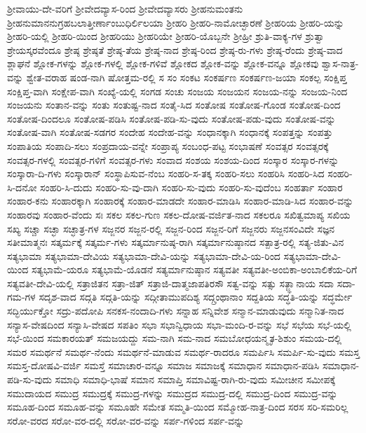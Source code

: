 {ಶ್ರೀವಾಯು-ದೇ-ವರಿಗೆ
ಶ್ರೀವೇದವ್ಯಾಸ-ರಿಂದ
ಶ್ರೀವೇದವ್ಯಾಸರು
ಶ್ರೀಹನುಮಂತನು
ಶ್ರೀಹನುಮಾನನುಗ್ರಹಬಲಾತ್ತೀರ್ಣಾಂಬುಧಿರ್ಲಿಲಯಾ
ಶ್ರೀಹರಿ
ಶ್ರೀಹರಿ-ನಾಮೋಚ್ಛಾರಣೆ
ಶ್ರೀಹರಿಯ
ಶ್ರೀಹರಿ-ಯನ್ನು
ಶ್ರೀಹರಿ-ಯಲ್ಲಿ
ಶ್ರೀಹರಿ-ಯಿಂದ
ಶ್ರೀಹರಿಯು
ಶ್ರೀಹರಿಯೇ
ಶ್ರೀಹರಿ-ಯೊಬ್ಬನೇ
ಶ್ರೀಹ್ರೀ
ಶ್ರುತಿ-ವಾಕ್ಯ-ಗಳ
ಶ್ರುತ್ವಾ
ಶ್ರೇಯಸ್ಕರವೆಂದೂ
ಶ್ರೇಷ್ಠ
ಶ್ರೇಷ್ಠತೆ
ಶ್ರೇಷ್ಠ-ತೆಯ
ಶ್ರೇಷ್ಠ-ನಾದ
ಶ್ರೇಷ್ಠ-ರಿಂದ
ಶ್ರೇಷ್ಠ-ರು-ಗಳು
ಶ್ರೇಷ್ಠ-ರೆಂದು
ಶ್ರೇಷ್ಠ-ವಾದ
ಶ್ಲಾಘನೆ
ಶ್ಲೋಕ-ಗಳನ್ನು
ಶ್ಲೋಕ-ಗಳಲ್ಲಿ
ಶ್ಲೋಕ-ಗಳಿವೆ
ಶ್ಲೋಕದ
ಶ್ಲೋಕ-ವನ್ನು
ಶ್ಲೋಕ-ವನ್ನೂ
ಶ್ಲೋಕವು
ಶ್ವಾಸ-ನಾತ್ರ-ವನ್ನು
ಶ್ವೇತ-ವರಾಹ
ಷಂಡ-ನಾಗಿ
ಷೋತ್ತಮ-ರಲ್ಲಿ
ಸ
ಸಂ
ಸಂಕಟ
ಸಂಕರ್ಷಣ
ಸಂಕರ್ಷಣ-ಜಯಾ
ಸಂಕಲ್ಪ
ಸಂಕ್ಷಿಪ್ತ
ಸಂಕ್ಷಿಪ್ತ-ವಾಗಿ
ಸಂಕ್ಷೇಪ-ವಾಗಿ
ಸಂಖ್ಯೆ-ಯಲ್ಲಿ
ಸಂಗಡ
ಸಂಚು
ಸಂಜಯ
ಸಂಜಯನ
ಸಂಜಯ-ನನ್ನು
ಸಂಜಯ-ನಿಂದ
ಸಂಜಯನು
ಸಂತಾನ-ವನ್ನು
ಸಂತು
ಸಂತುಷ್ಟ-ನಾದ
ಸಂತೈ-ಸಿದ
ಸಂತೋಷ
ಸಂತೋಷ-ಗೊಂಡ
ಸಂತೋಷ-ದಿಂದ
ಸಂತೋಷ-ದಿಂದಲೂ
ಸಂತೋಷ-ಪಡಿಸಿ
ಸಂತೋಷ-ಪಡಿ-ಸು-ವುದು
ಸಂತೋಷ-ಪಡು-ವುದು
ಸಂತೋಷ-ವನ್ನು
ಸಂತೋಷ-ವಾಗಿ
ಸಂತೋಷ-ಸಡಗರ
ಸಂದೇಹ
ಸಂದೇಹ-ವನ್ನು
ಸಂಧಾನಕ್ಕಾಗಿ
ಸಂಧಾನಕ್ಕೆ
ಸಂಪತ್ತನ್ನು
ಸಂಪತ್ತು
ಸಂಪಾತಿಯ
ಸಂಪಾದಿ-ಸಲು
ಸಂಪ್ರದಾಯ-ವನ್ನೇ
ಸಂಪ್ರಾಪ್ಯ
ಸಂಬಂಧ-ಪಟ್ಟ
ಸಂಭಾಷಣೆ
ಸಂವತ್ಸರ
ಸಂವತ್ಸರಕ್ಕೆ
ಸಂವತ್ಸರ-ಗಳಲ್ಲಿ
ಸಂವತ್ಸರ-ಗಳಿಗೆ
ಸಂವತ್ಸರ-ಗಳು
ಸಂವಾದ
ಸಂಶಯ
ಸಂಶಯ-ದಿಂದ
ಸಂಸ್ಕಾರ
ಸಂಸ್ಕಾರ-ಗಳನ್ನು
ಸಂಸ್ಕಾರಾ-ದಿ-ಗಳು
ಸಂಸ್ಕಾರಾನ್
ಸಂಸ್ಥಾಪಿಸುವ-ನೆಂಬ
ಸಂಹರಿ-ಸ-ತಕ್ಕ
ಸಂಹರಿ-ಸಲು
ಸಂಹರಿಸಿ
ಸಂಹರಿ-ಸಿದ
ಸಂಹರಿ-ಸಿ-ದನೋ
ಸಂಹರಿ-ಸಿ-ದುದು
ಸಂಹರಿ-ಸು-ವು-ದಾಗಿ
ಸಂಹರಿ-ಸು-ವುದು
ಸಂಹರಿ-ಸು-ವುದೆಂಬ
ಸಂಹರ್ತಾ
ಸಂಹಾರ
ಸಂಹಾರ-ಕನು
ಸಂಹಾರಕ್ಕಾಗಿ
ಸಂಹಾರಕ್ಕೆ
ಸಂಹಾರ-ಮಾಡದೇ
ಸಂಹಾರ-ಮಾಡಿಸಿ
ಸಂಹಾರ-ಮಾಡಿ-ಸಿದ
ಸಂಹಾರ-ವನ್ನು
ಸಂಹಾರವು
ಸಂಹಾರ-ವೆಂದು
ಸಃ
ಸಕಲ
ಸಕಲ-ಗುಣ
ಸಕಲ-ದೋಷ-ವರ್ಜಿತ-ನಾದ
ಸಕಲರೂ
ಸಖಿತ್ವಮಾಪ್ಯ
ಸಖಿಯ
ಸಖ್ಯ
ಸಚ್ಚಾ
ಸಚ್ಛಾ
ಸಚ್ಛಾತ್ರ-ಗಳ
ಸಜ್ಜನರ
ಸಜ್ಜನ-ರಲ್ಲಿ
ಸಜ್ಜನ-ರಿಂದ
ಸಜ್ಜನ-ರಿಗೆ
ಸಜ್ಜನರು
ಸಜ್ಜನಸಂವಿದೇ
ಸಜ್ಞನ
ಸತೀಮಾತ್ಮನಃ
ಸತ್ಕರ್ಮಕ್ಕೆ
ಸತ್ಕರ್ಮ-ಗಳು
ಸತ್ಕರ್ಮಾನುಷ್ಠ-ರಾಗಿ
ಸತ್ಕರ್ಮಾನುಷ್ಠಾನದ
ಸತ್ಪಾತ್ರ-ರಲ್ಲಿ
ಸತ್ಯ-ಜಿತು-ವಿನ
ಸತ್ಯಭಾಮಾ
ಸತ್ಯಭಾಮಾ-ದೇವಿಯ
ಸತ್ಯಭಾಮಾ-ದೇವಿ-ಯನ್ನು
ಸತ್ಯಭಾಮಾ-ದೇವಿ-ಯ-ರಿಂದ
ಸತ್ಯಭಾಮಾ-ದೇವಿ-ಯಿಂದ
ಸತ್ಯಭಾಮೆ-ಯರೂ
ಸತ್ಯಭಾಮೆ-ಯೊಡನೆ
ಸತ್ಯರ್ಮಾನುಷ್ಠಾನ
ಸತ್ಯವತೀ
ಸತ್ಯವತೀ-ಅಂಬಿಕಾ-ಅಂಬಾಲಿಕೆಯ-ರಿಗೆ
ಸತ್ಯವತೀ-ದೇವಿ-ಯಲ್ಲಿ
ಸತ್ರಾಜಿತನ
ಸತ್ರಾ-ಜಿತ್
ಸತ್ರಾಜಿ-ದಾತ್ಮಜಾಪತಿರಸೌ
ಸತ್ವ-ವನ್ನು
ಸತ್ಸು
ಸತ್ಜ್ಞಾನಾಯ
ಸದಾ
ಸದಾ-ಗಮ-ಗಳ
ಸದೃಶ-ವಾದ
ಸದ್ಗತಿ
ಸದ್ಗತಿ-ಯನ್ನು
ಸದ್ಗೀತಾಮುಪದಿಶ್ಯ
ಸದ್ಗ್ರಂಥಾನಾಂ
ಸದ್ದತಿಯ
ಸದ್ಧತಿ-ಯನ್ನು
ಸದ್ಧರ್ಮೇ
ಸದ್ಭಿರ್ಯುಕ್ತೋ
ಸದ್ರು-ಪದೋಪಿ
ಸನಕಸ-ನಂದಾದಿ-ಗಳು
ಸನ್ನಾಹ
ಸನ್ನಿವೇಶ
ಸನ್ಮಾನ-ಮಾಡುವುದು
ಸನ್ಮಾನಿತ-ನಾದ
ಸನ್ಯಾಸ-ವೇಷದಿಂದ
ಸನ್ಯಾಸಿ-ವೇಷದ
ಸಪತಿಂ
ಸಭಾ
ಸಭಾನ್ವಿಧಾಯ
ಸಭಾ-ಮಂದಿ-ರ-ವನ್ನು
ಸಭೆ
ಸಭೆಯ
ಸಭೆ-ಯಲ್ಲಿ
ಸಭೆ-ಯಿಂದ
ಸಮಕಾರಯತ್
ಸಮಜಯದ್ದು
ಸಮ-ನಾಗಿ
ಸಮ-ನಾದ
ಸಮಬೋಧಯನ್ಮೃತ-ಶಿಶುಂ
ಸಮಯ-ದಲ್ಲಿ
ಸಮರ
ಸಮರ್ಥನೆ
ಸಮರ್ಥ-ನೆಂದು
ಸಮರ್ಥನೆ-ಮಾಡುವ
ಸಮರ್ಥ-ರಾದರೂ
ಸಮರ್ಪಿಸಿ
ಸಮರ್ಪಿ-ಸು-ವುದು
ಸಮಸ್ತ
ಸಮಸ್ತ-ದೋಷವಿ-ವರ್ಜಿ
ಸಮಸ್ತೆ
ಸಮಾಚಾರ-ವನ್ನೂ
ಸಮಾಜ
ಸಮಾಜಕ್ಕೆ
ಸಮಾಧಾನ
ಸಮಾಧಾನ-ಪಡಿಸಿ
ಸಮಾಧಾನ-ಪಡಿ-ಸು-ವುದು
ಸಮಾಧಿ
ಸಮಾಧಿ-ಭಾಷೆ
ಸಮಾನ
ಸಮಾಪ್ತಿ
ಸಮಾವಿಷ್ಟ-ರಾಗಿ-ರು-ವುದು
ಸಮೀಚೀನ
ಸಮೀಪಕ್ಕೆ
ಸಮುದಾಯದ
ಸಮುದ್ರ
ಸಮುದ್ರಕ್ಕೆ
ಸಮುದ್ರ-ಗಳನ್ನು
ಸಮುದ್ರದ
ಸಮುದ್ರ-ದಲ್ಲಿ
ಸಮುದ್ರ-ದಿಂದ
ಸಮುದ್ರ-ವನ್ನು
ಸಮೂಹ-ದಿಂದ
ಸಮೂಹ-ವನ್ನು
ಸಮೂಹೇ
ಸಮೇತ
ಸಮ್ಮತಿ-ಯಿಂದ
ಸಮ್ಮೋಹ-ನಾತ್ರ-ದಿಂದ
ಸರಸ
ಸರಿ-ಸಮರಿಲ್ಲ
ಸರೋ-ವರದ
ಸರೋ-ವರ-ದಲ್ಲಿ
ಸರೋ-ವರ-ವನ್ನು
ಸರ್ಪ-ಗಳಿಂದ
ಸರ್ಪ-ವನ್ನು
}
